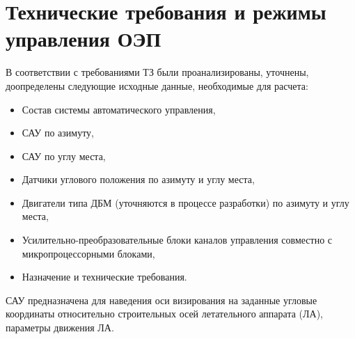 \section{Технические требования и режимы управления ОЭП} \label{ch:ch4/sect1}

В соответствии с требованиями ТЗ были проанализированы, уточнены, доопределены следующие исходные данные, необходимые для расчета:
\begin{itemize}
	\item Состав системы автоматического управления,
	\item САУ по азимуту,
	\item САУ по углу места,
	\item Датчики углового положения по азимуту и углу места,
	\item Двигатели типа ДБМ (уточняются в процессе разработки) по азимуту и углу места,
	\item Усилительно-преобразовательные блоки каналов управления совместно с микропроцессорными блоками,
	\item Назначение и технические требования.
\end{itemize}
САУ предназначена для наведения оси визирования на заданные угловые координаты относительно строительных осей летательного аппарата (ЛА), параметры движения ЛА.

\newpage

